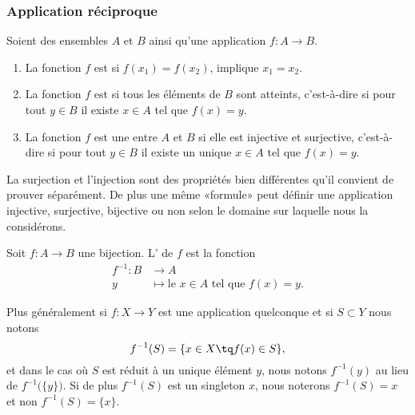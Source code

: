 \subsubsection{Application réciproque}

\begin{definition}        \label{DEFooBFCQooPyKvRK}
	Soient des ensembles \( A\) et \( B\) ainsi qu'une application \( f\colon A\to B\).
	\begin{enumerate}
		\item
		      La fonction \( f\) est  si \( f(x_1)=f(x_2)\), implique \( x_1=x_2\).
		\item
		      La fonction \( f\) est  si tous les éléments de \( B\) sont atteints, c'est-à-dire si pour tout \( y\in B\) il existe \( x\in A\) tel que \( f(x)=y\).
		\item
		      La fonction \( f\) est une  entre \( A\) et \( B\) si elle est injective et surjective, c'est-à-dire si pour tout \( y\in B\) il existe un unique \( x\in A\) tel que \( f(x)=y\).
	\end{enumerate}
\end{definition}
La surjection et l'injection sont des propriétés bien différentes qu'il convient de prouver séparément. De plus une même «formule» peut définir une application injective, surjective, bijective ou non selon le domaine sur laquelle nous la considérons.

\begin{definition}      \label{DEFooTRGYooRxORpY}
	Soit \( f\colon A\to B\) une bijection. L' de \( f\) est la fonction
	\begin{equation}
		\begin{aligned}
			f^{-1}\colon B & \to A                                             \\
			y              & \mapsto \text{le } x\in A\text{ tel que } f(x)=y.
		\end{aligned}
	\end{equation}
\end{definition}

Plus généralement si \( f\colon X\to Y\) est une application quelconque et si \( S\subset Y\) nous notons
\begin{equation}
	f^{-1}(S)=\{ x\in X\tq f(x)\in S \},
\end{equation}
et dans le cas où \( S\) est réduit à un unique élément \( y\), nous notons \( f^{-1}(y)\) au lieu de \( f^{-1}\big( \{ y \} \big)\). Si de plus \( f^{-1}(S)\) est un singleton \( x\), nous noterons \( f^{-1}(S)=x\) et non \( f^{-1}(S)=\{ x \}\).

